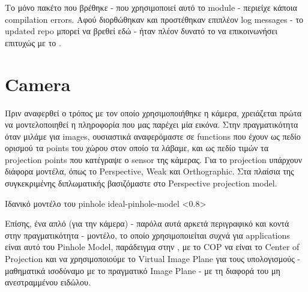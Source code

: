 Το μόνο  πακέτο που βρέθηκε \cite{ros-adafruit-10dof-imu-original} - που χρησιμοποιεί αυτό το module - περιείχε κάποια compilation errors. Αφού διορθώθηκαν και προστέθηκαν επιπλέον log messages - το updated repo μπορεί να βρεθεί εδώ \cite{ros-adafruit-10dof-imu-cspyridakis} - ήταν πλέον δυνατό το  να επικοινωνήσει επιτυχώς με το .


\section{Camera} \label{sec:design-implementation-camera}

Πριν αναφερθεί ο τρόπος με τον οποίο χρησιμοποιήθηκε η κάμερα, χρειάζεται πρώτα να μοντελοποιηθεί η πληροφορία που μας παρέχει μία εικόνα. Στην πραγματικότητα όταν μιλάμε για images, ουσιαστικά αναφερόμαστε σε functions που έχουν ως πεδίο ορισμού τα  points του χώρου στον οποίο τα λάβαμε, και ως πεδίο τιμών τα  projection points που κατέγραψε ο sensor της κάμερας. Για το projection υπάρχουν διάφορα μοντέλα, όπως το Perspective, Weak και Orthographic. Στα πλαίσια της συγκεκριμένης διπλωματικής βασιζόμαστε στο Perspective projection model.


%
{Ιδανικό μοντέλο του pinhole}%
{ideal-pinhole-model}%
<0.8>

Επίσης, ένα απλό (για την κάμερα) - παρόλα αυτά αρκετά περιγραφικό και κοντά στην πραγματικότητα - μοντέλο, το οποίο χρησιμοποιείται συχνά για  applications είναι αυτό του Pinhole Model, παράδειγμα στην , με το COP να είναι το Center of Projection και να χρησιμοποιούμε το Virtual Image Plane για τους υπολογισμούς - μαθηματικά ισοδύναμο με το πραγματικό Image Plane - με τη διαφορά του μη ανεστραμμένου ειδώλου.

